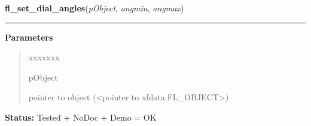     \label{xformslib:library:fl_set_dial_angles}

    \vspace{0.5ex}

\hspace{.8\funcindent}\begin{boxedminipage}{\funcwidth}

    \raggedright \textbf{fl\_set\_dial\_angles}(\textit{pObject}, \textit{angmin}, \textit{angmax})

    \vspace{-1.5ex}

    \rule{\textwidth}{0.5\fboxrule}
\setlength{\parskip}{2ex}
\setlength{\parskip}{1ex}
      \textbf{Parameters}
      \vspace{-1ex}

      \begin{quote}
        \begin{Ventry}{xxxxxxx}

          \item[pObject]

          pointer to object ({\textless}pointer to 
          xfdata.FL\_OBJECT{\textgreater})

        \end{Ventry}

      \end{quote}

\textbf{Status:} Tested + NoDoc + Demo = OK



    \end{boxedminipage}

    \label{xformslib:library:fl_set_dial_cross}

    \vspace{0.5ex}

